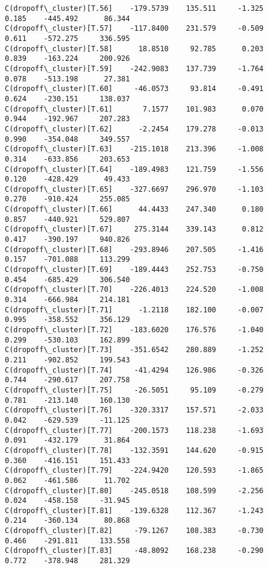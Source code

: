 \documentclass[11pt]{article}
\begin{document}
\begin{Verbatim}[commandchars=\\\{\}]
C(dropoff\_cluster)[T.56]    -179.5739    135.511     -1.325      0.185    -445.492      86.344
C(dropoff\_cluster)[T.57]    -117.8400    231.579     -0.509      0.611    -572.275     336.595
C(dropoff\_cluster)[T.58]      18.8510     92.785      0.203      0.839    -163.224     200.926
C(dropoff\_cluster)[T.59]    -242.9083    137.739     -1.764      0.078    -513.198      27.381
C(dropoff\_cluster)[T.60]     -46.0573     93.814     -0.491      0.624    -230.151     138.037
C(dropoff\_cluster)[T.61]       7.1577    101.983      0.070      0.944    -192.967     207.283
C(dropoff\_cluster)[T.62]      -2.2454    179.278     -0.013      0.990    -354.048     349.557
C(dropoff\_cluster)[T.63]    -215.1018    213.396     -1.008      0.314    -633.856     203.653
C(dropoff\_cluster)[T.64]    -189.4983    121.759     -1.556      0.120    -428.429      49.433
C(dropoff\_cluster)[T.65]    -327.6697    296.970     -1.103      0.270    -910.424     255.085
C(dropoff\_cluster)[T.66]      44.4433    247.340      0.180      0.857    -440.921     529.807
C(dropoff\_cluster)[T.67]     275.3144    339.143      0.812      0.417    -390.197     940.826
C(dropoff\_cluster)[T.68]    -293.8946    207.505     -1.416      0.157    -701.088     113.299
C(dropoff\_cluster)[T.69]    -189.4443    252.753     -0.750      0.454    -685.429     306.540
C(dropoff\_cluster)[T.70]    -226.4013    224.520     -1.008      0.314    -666.984     214.181
C(dropoff\_cluster)[T.71]      -1.2118    182.100     -0.007      0.995    -358.552     356.129
C(dropoff\_cluster)[T.72]    -183.6020    176.576     -1.040      0.299    -530.103     162.899
C(dropoff\_cluster)[T.73]    -351.6542    280.889     -1.252      0.211    -902.852     199.543
C(dropoff\_cluster)[T.74]     -41.4294    126.986     -0.326      0.744    -290.617     207.758
C(dropoff\_cluster)[T.75]     -26.5051     95.109     -0.279      0.781    -213.140     160.130
C(dropoff\_cluster)[T.76]    -320.3317    157.571     -2.033      0.042    -629.539     -11.125
C(dropoff\_cluster)[T.77]    -200.1573    118.238     -1.693      0.091    -432.179      31.864
C(dropoff\_cluster)[T.78]    -132.3591    144.620     -0.915      0.360    -416.151     151.433
C(dropoff\_cluster)[T.79]    -224.9420    120.593     -1.865      0.062    -461.586      11.702
C(dropoff\_cluster)[T.80]    -245.0518    108.599     -2.256      0.024    -458.158     -31.945
C(dropoff\_cluster)[T.81]    -139.6328    112.367     -1.243      0.214    -360.134      80.868
C(dropoff\_cluster)[T.82]     -79.1267    108.383     -0.730      0.466    -291.811     133.558
C(dropoff\_cluster)[T.83]     -48.8092    168.238     -0.290      0.772    -378.948     281.329

\end{Verbatim}
\end{document}
